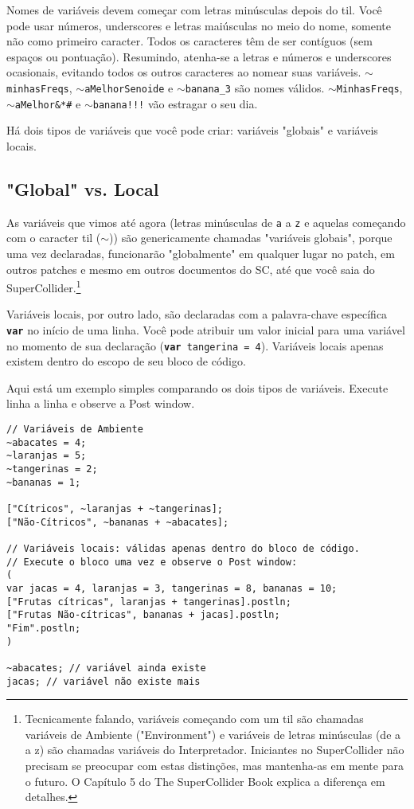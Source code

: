 Nomes de variáveis devem começar com letras minúsculas depois do til. Você pode usar números, underscores e letras maiúsculas no meio do nome, somente não como primeiro caracter. Todos os caracteres têm de ser contíguos (sem espaços ou pontuação). Resumindo, atenha-se a letras e números e underscores ocasionais, evitando todos os outros caracteres ao nomear suas variáveis. \texttt{$\sim$minhasFreqs}, \texttt{$\sim$aMelhorSenoide} e \texttt{$\sim$banana\_3} são nomes válidos. \texttt{$\sim$MinhasFreqs}, \texttt{$\sim$aMelhor\&*\#\@Senoide} e \texttt{$\sim$banana!!!} vão estragar o seu dia.

Há dois tipos de variáveis que você pode criar: variáveis "globais" e variáveis locais.

\subsection{"Global" vs. Local}

As variáveis que vimos até agora (letras minúsculas de \texttt{a} a \texttt{z} e aquelas começando com o caracter til ($\sim$)) são genericamente chamadas "variáveis globais", porque uma vez declaradas, funcionarão "globalmente" em qualquer lugar no patch, em outros patches e mesmo em outros documentos do SC, até que você saia do SuperCollider.\footnote{Tecnicamente falando, variáveis começando com um til são chamadas variáveis de Ambiente ("Environment") e variáveis de letras minúsculas (de a a z) são chamadas variáveis do Interpretador. Iniciantes no SuperCollider não precisam se preocupar com estas distinções, mas mantenha-as em mente para o futuro. O Capítulo 5 do The SuperCollider Book explica a diferença em detalhes.}

Variáveis locais, por outro lado, são declaradas com a palavra-chave específica \texttt{\textbf{var}} no início de uma linha. Você pode atribuir um valor inicial para uma variável no momento de sua declaração (\texttt{\textbf{var} tangerina = 4}). Variáveis locais apenas existem dentro do escopo de seu bloco de código.

Aqui está um exemplo simples comparando os dois tipos de variáveis. Execute linha a linha e observe a Post window.

 
\begin{lstlisting}[style=SuperCollider-IDE, basicstyle=\scttfamily\footnotesize]
// Variáveis de Ambiente
~abacates = 4;
~laranjas = 5;
~tangerinas = 2;
~bananas = 1;

["Cítricos", ~laranjas + ~tangerinas];
["Não-Cítricos", ~bananas + ~abacates];

// Variáveis locais: válidas apenas dentro do bloco de código.
// Execute o bloco uma vez e observe o Post window:
(
var jacas = 4, laranjas = 3, tangerinas = 8, bananas = 10;
["Frutas cítricas", laranjas + tangerinas].postln;
["Frutas Não-cítricas", bananas + jacas].postln;
"Fim".postln;
)

~abacates; // variável ainda existe
jacas; // variável não existe mais
\end{lstlisting}

